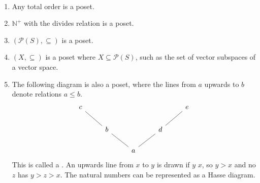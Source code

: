\begin{example} ~\vspace*{-1.5\baselineskip}
    \begin{enumerate}
        \item Any total order is a poset.
        \item $\mathbb N^+$ with the divides relation is a poset.
        \item $(\mathcal P(S), \subseteq)$ is a poset.
        \item $(X, \subseteq)$ is a poset where $X \subseteq \mathcal P(S)$, such as the set of vector subspaces of a vector space.
        \item The following diagram is also a poset, where the lines from $a$ upwards to $b$ denote relations $a \leq b$.
        \[\begin{tikzcd}
            c &&&& e \\
            & b && d \\
            && a
            \arrow[no head, from=3-3, to=2-2]
            \arrow[no head, from=2-2, to=1-1]
            \arrow[no head, from=3-3, to=2-4]
            \arrow[no head, from=2-4, to=1-5]
        \end{tikzcd}\]
        This is called a .
        An upwards line from $x$ to $y$ is drawn if $y$  $x$, so $y > x$ and no $z$ has $y > z > x$.
        The natural numbers can be represented as a Hasse diagram.


\end{enumerate}
\end{example}

